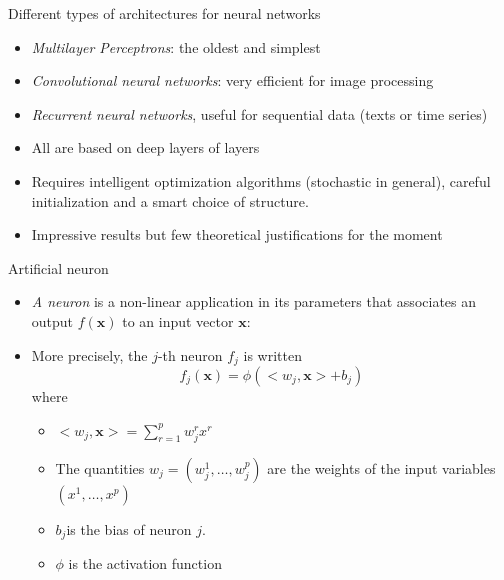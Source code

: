 \documentclass[ignorenonframetext,]{beamer}
\providecommand{\tightlist}{%
  \setlength{\itemsep}{0pt}\setlength{\parskip}{0pt}}
\begin{document}
\begin{frame}{Different types of architectures for neural networks}
\protect\hypertarget{different-types-of-architectures-for-neural-networks}{}

\begin{itemize}
\item
  \emph{Multilayer Perceptrons}: the oldest and simplest
\item
  \emph{Convolutional neural networks}: very efficient for image
  processing
\item
  \emph{Recurrent neural networks}, useful for sequential data (texts or
  time series)
\item
  All are based on deep layers of layers
\item
  Requires intelligent optimization algorithms (stochastic in general),
  careful initialization and a smart choice of structure.
\item
  Impressive results but few theoretical justifications for the moment
\end{itemize}

\end{frame}

\begin{frame}{Artificial neuron}
\protect\hypertarget{artificial-neuron}{}

\begin{itemize}
\item
  \emph{A neuron} is a non-linear application in its parameters that
  associates an output \(f(\mathbf{x})\) to an input vector
  \(\mathbf{x}\):
\item
  More precisely, the \(j\)-th neuron \(f_j\) is written\\
  \[f_j (\mathbf{x}) = \phi (<w_j, \mathbf {x}> + b_j)\] where

  \begin{itemize}
  \tightlist
  \item
    \(<w_j, \mathbf{x}> = \sum_{r = 1}^p w_j^r x^r\)
  \item
    The quantities \(w_j = (w_j^1, \dots, w_j^p)\) are the weights of
    the input variables \((x^1, \dots, x^p)\)
  \item
    \(b_j\)is the bias of neuron \(j\).
  \item
    \(\phi\) is the activation function
  \end{itemize}
\end{itemize}

\end{frame}
\end{document}
